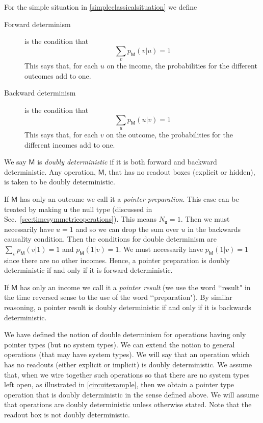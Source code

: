 \documentclass[10pt]{article}
\begin{document}
For the simple situation in \eqref{simpleclassicalsituation} we define
\begin{description}
\item[Forward determinism] is the condition that
\begin{equation} \sum_v p_\mathsf{M}(v|u) = 1  \end{equation}
This says that, for each $u$ on the income, the probabilities for the different outcomes add to one.
\item[Backward determinism] is the condition that
\begin{equation} \sum_u p_\mathsf{M}(u|v) = 1  \end{equation}
This says that, for each $v$ on the outcome, the probabilities for the different incomes add to one.
\end{description}
We say $\mathsf M$ is \emph{doubly deterministic} if it is both forward and backward deterministic.   Any operation, $\mathsf M$, that has no readout boxes (explicit or hidden), is taken to be doubly deterministic.

If $\mathsf M$ has only an outcome we call it a \emph{pointer preparation}. This case can be treated by making $\mathtt u$ the null type (discussed in Sec.\ \ref{sec:timesymmetricoperations}).  This means $N_\mathtt{u}=1$. Then we must necessarily have $u=1$ and so we can drop the sum over $u$ in the backwards causality condition.  Then the conditions for double determinism are $\sum_v p_\mathsf{M}(v|1) = 1$ and $p_\mathsf{M}(1|v)=1$.  We must necessarily have $p_\mathsf{M}(1|v)=1$ since there are no other incomes.  Hence, a pointer preparation is doubly deterministic if and only if it is forward deterministic.

If $\mathsf M$ has only an income we call it a \emph{pointer result} (we use the word \lq\lq result" in the time reversed sense to the use of the word \lq\lq preparation"). By similar reasoning,  a pointer result is doubly deterministic if and only if it is backwards deterministic.

We have defined the notion of double determinism for operations having only pointer types (but no system types).   We can extend the notion to general operations (that may have system types).  We will say that an operation which has no readouts (either explicit or implicit) is doubly deterministic.  We assume that, when we wire together such operations so that there are no system types left open, as illustrated in \eqref{circuitexample}, then we obtain a pointer type operation that is doubly deterministic in the sense defined above.  We will assume that operations are doubly deterministic unless otherwise stated.   Note that the readout box is not doubly deterministic.
\end{document}
